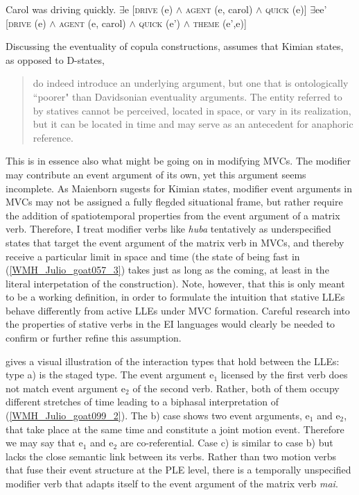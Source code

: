 \ea Carol was driving quickly.
\ea \label{carola} $\exists$e [\textsc{drive} (e) $\land$ \textsc{agent} (e, carol) $\land$ \textsc{quick} (e)]
\ex \label{carolb} $\exists$ee' [\textsc{drive} (e) $\land$ \textsc{agent} (e, carol) $\land$ \textsc{quick} (e') $\land$ \textsc{theme} (e',e)]
\z
\z

Discussing the eventuality of copula constructions, \citet[304]{maienborn2005limits} assumes that Kimian states, as opposed to D-states, 

\begin{quote}do indeed introduce an underlying argument, but one that is ontologically ``poorer" than Davidsonian eventuality arguments. The entity referred to by statives cannot be perceived, located in space, or vary in its realization, but it can be located in time and may serve as an antecedent for anaphoric reference.\end{quote}

This is in essence also what might be going on in modifying MVCs. The modifier may contribute an event argument of its own, yet this argument seems incomplete. As Maienborn sugests for Kimian states, modifier event arguments in MVCs may not be assigned a fully flegded situational frame, but rather require the addition of spatiotemporal properties from the event argument of a matrix verb. Therefore, I treat modifier verbs like \textit{huba} tentatively as underspecified states that target the event argument of the matrix verb in MVCs, and thereby receive a particular limit in space and time (the state of being fast in (\ref{WMH_Julio_goat057_3}) takes just as long as the coming, at least in the literal interpetation of the construction). Note, however, that this is only meant to be a working definition, in order to formulate the intuition that stative LLEs behave differently from active LLEs under MVC formation. Careful research into the properties of stative verbs in the EI languages would clearly be needed to confirm or further refine this assumption.

 gives a visual illustration of the interaction types that hold between the LLEs: type a) is the staged type. The event argument e$_1$ licensed by the first verb does not match event argument e$_2$ of the second verb. Rather, both of them occupy different stretches of time leading to a biphasal interpretation of (\ref{WMH_Julio_goat099_2}). The b) case shows two event arguments, e$_1$ and e$_2$, that take place at the same time and constitute a joint motion event. Therefore we may say that e$_1$ and e$_2$ are co-referential. Case c) is similar to case b) but lacks the close semantic link between its verbs. Rather than two motion verbs that fuse their event structure at the PLE level, there is a temporally unspecified modifier verb that adapts itself to the event argument of the matrix verb \textit{mai}.

